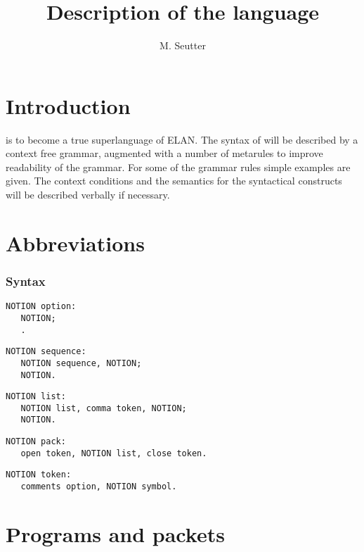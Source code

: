 \documentclass [a4paper,12pt,fleqn]{article}
\title {Description of the language \ELAN}
\author {M. Seutter}
\begin{document}
\maketitle
\section {Introduction}
\ELAN is to become a true superlanguage of {\sf ELAN}. The syntax of
\ELAN will be described by a context free grammar, augmented with
a number of metarules to improve readability of the grammar. For some
of the grammar rules simple examples are given. The context conditions
and the semantics for the syntactical constructs will be described
verbally if necessary.
\section {Abbreviations}
\subsubsection*{Syntax}
\begin {letterlist}
\item
\begin {verbatim}
NOTION option:
   NOTION;
   .
\end{verbatim}
\item
\begin{verbatim}
NOTION sequence:
   NOTION sequence, NOTION;
   NOTION.
\end{verbatim}
\item
\begin {verbatim}
NOTION list:
   NOTION list, comma token, NOTION;
   NOTION.
\end{verbatim}
\item
\begin{verbatim}
NOTION pack:
   open token, NOTION list, close token.
\end{verbatim}
\item
\begin{verbatim}
NOTION token:
   comments option, NOTION symbol.
\end{verbatim}
\end{letterlist}
\section {Programs and packets}
\end{document}
